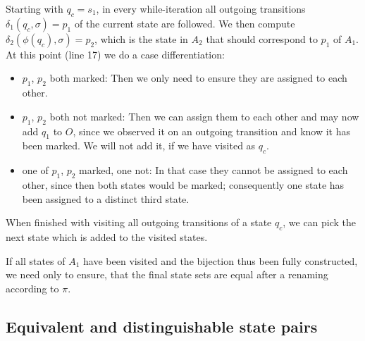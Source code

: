 Starting with $q_c = s_1$, in every while-iteration all outgoing transitions $\delta_1(q_c, \sigma) = p_1$ of the current state are followed. We then compute $\delta_2(\phi(q_c), \sigma) = p_2$, which is the state in $A_2$ that should correspond to $p_1$ of $A_1$. At this point (line 17) we do a case differentiation:
\begin{itemize}
	\item $p_1$, $p_2$ both marked: Then we only need to ensure they are assigned to each other.
	\item $p_1$, $p_2$ both not marked: Then we can assign them to each other and may now add $q_1$ to $O$, since we observed it on an outgoing transition and know it has been marked. We will not add it, if we have visited as $q_c$.
	\item one of $p_1$, $p_2$ marked, one not: In that case they cannot be assigned to each other, since then both states would be marked; consequently one state has been assigned to a distinct third state.
\end{itemize}
When finished with visiting all outgoing transitions of a state $q_c$, we can pick the next state which is added to the visited states.

If all states of $A_1$ have been visited and the bijection thus been fully constructed, we need only to ensure, that the final state sets are equal after a renaming according to $\pi$.

\subsection{Equivalent and distinguishable state pairs}

